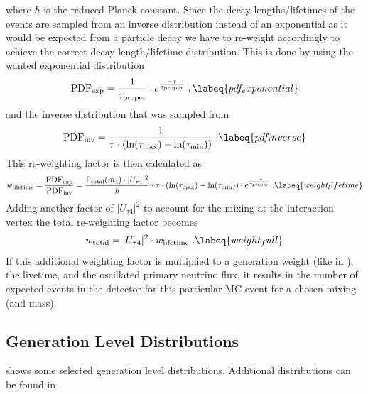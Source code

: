 where $\hbar$ is the reduced Planck constant. Since the decay lengths/lifetimes of the events are sampled from an inverse distribution instead of an exponential as it would be expected from a particle decay we have to re-weight accordingly to achieve the correct decay length/lifetime distribution. This is done by using the wanted exponential distribution
\begin{equation}
    \mathrm{PDF}_\mathrm{exp} = \frac{1}{\tau_\mathrm{proper}} \cdot e^{\frac{-\tau}{\tau_\mathrm{proper}}}
    \;,
    \labeq{pdf_exponential}
\end{equation}
and the inverse distribution that was sampled from
\begin{equation}
    \mathrm{PDF}_\mathrm{inv} = \frac{1}{\tau \cdot (\ln(\tau_\mathrm{max}) - \ln(\tau_\mathrm{min}))}
    \;.
    \labeq{pdf_inverse}
\end{equation}
This re-weighting factor is then calculated as
\begin{equation}
    w_\mathrm{lifetime} = \frac{\mathrm{PDF}_\mathrm{exp}}{\mathrm{PDF}_\mathrm{inv}} = \frac{\Gamma_\mathrm{total}(m_4) \cdot |U_{\tau4}|^2}{\hbar} \cdot \tau \cdot (\ln(\tau_\mathrm{max}) - \ln(\tau_\mathrm{min})) \cdot e^{\frac{-\tau}{\tau_\mathrm{proper}}}
    \;.
    \labeq{weight_lifetime}
\end{equation}
Adding another factor of $|U_{\tau4}|^2$ to account for the mixing at the interaction vertex the total re-weighting factor becomes
\begin{equation}
    w_\mathrm{total} = |U_{\tau4}|^2 \cdot w_\mathrm{lifetime}
    \;.
    \labeq{weight_full}
\end{equation}
If this additional weighting factor is multiplied to a generation weight (like in ), the livetime, and the oscillated primary neutrino flux, it results in the number of expected events in the detector for this particular MC event for a chosen mixing (and mass).


\subsection{Generation Level Distributions}

 shows some selected generation level distributions. Additional distributions can be found in .

